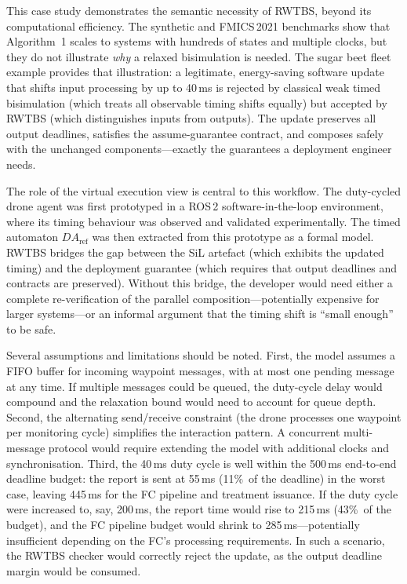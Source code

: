 \documentclass[11pt,a4paper]{article}
\newcommand{\DAref}{\mathit{DA}_{\mathrm{ref}}}
\newcommand{\RWTBS}{RWTBS}
\begin{document}
This case study demonstrates the semantic necessity of \RWTBS{}, beyond its
computational efficiency.  The synthetic and FMICS\,2021 benchmarks show that
Algorithm~1 scales to systems with hundreds of states and multiple clocks, but
they do not illustrate \emph{why} a relaxed bisimulation is needed.  The sugar
beet fleet example provides that illustration: a legitimate, energy-saving
software update that shifts input processing by up to 40\,ms is rejected by
classical weak timed bisimulation (which treats all observable timing shifts
equally) but accepted by \RWTBS{} (which distinguishes inputs from outputs).
The update preserves all output deadlines, satisfies the assume-guarantee
contract, and composes safely with the unchanged components---exactly the
guarantees a deployment engineer needs.

The role of the virtual execution view is central to this workflow.  The
duty-cycled drone agent was first prototyped in a ROS\,2 software-in-the-loop
environment, where its timing behaviour was observed and validated
experimentally.  The timed automaton $\DAref$ was then extracted from this
prototype as a formal model.  \RWTBS{} bridges the gap between the SiL
artefact (which exhibits the updated timing) and the deployment guarantee
(which requires that output deadlines and contracts are preserved).  Without
this bridge, the developer would need either a complete re-verification of the
parallel composition---potentially expensive for larger systems---or an informal
argument that the timing shift is ``small enough'' to be safe.

Several assumptions and limitations should be noted.  First, the model assumes
a FIFO buffer for incoming waypoint messages, with at most one pending message
at any time.  If multiple messages could be queued, the duty-cycle delay would
compound and the relaxation bound would need to account for queue depth.
Second, the alternating send/receive constraint (the drone processes one
waypoint per monitoring cycle) simplifies the interaction pattern.  A
concurrent multi-message protocol would require extending the model with
additional clocks and synchronisation.  Third, the 40\,ms duty cycle is
well within the 500\,ms end-to-end deadline budget: the report is sent at
55\,ms (11\%\ of the deadline) in the worst case, leaving 445\,ms for the FC
pipeline and treatment issuance.  If the duty cycle were increased to, say,
200\,ms, the report time would rise to 215\,ms (43\%\ of the budget), and the
FC pipeline budget would shrink to 285\,ms---potentially insufficient depending
on the FC's processing requirements.  In such a scenario, the \RWTBS{} checker
would correctly reject the update, as the output deadline margin would be
consumed.
\end{document}
